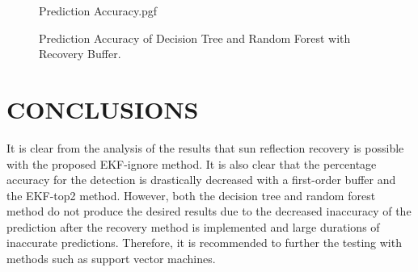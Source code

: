 \documentclass[letterpaper, 10 pt, conference]{ieeeconf}  %
\begin{document}
\begin{figure}[!htb]
	\begin{center}
		{Prediction Accuracy.pgf}
	\end{center}
	\caption[Prediction Accuracy of Decision Tree and Random Forest with Recovery Buffer]{Prediction Accuracy of Decision Tree and Random Forest with Recovery Buffer.}
	\label{fig:Prediction Accuracy EKF-ignore RF}
\end{figure}

\section{CONCLUSIONS}
It is clear from the analysis of the results that sun reflection recovery is possible with the proposed EKF-ignore method. It is also clear that the percentage accuracy for the detection is drastically decreased with a first-order buffer and the EKF-top2 method. However, both the decision tree and random forest method do not produce the desired results due to the decreased inaccuracy of the prediction after the recovery method is implemented and large durations of inaccurate predictions. Therefore, it is recommended to further the testing with methods such as support vector machines.

\addtolength{\textheight}{-12cm}   %







\printbibliography[heading=bibintoc]




\end{document}
